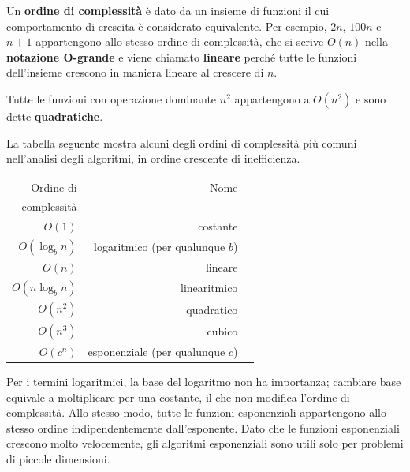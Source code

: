 \documentclass[10pt]{book}
\begin{document}
Un {\bf ordine di complessità} è dato da un insieme di funzioni il cui comportamento di crescita è considerato equivalente.  Per esempio, $2n$, $100n$ e $n+1$ appartengono allo stesso ordine di complessità, che si scrive $O(n)$ nella {\bf notazione O-grande} e viene chiamato {\bf lineare} perché tutte le funzioni dell'insieme crescono in maniera lineare al crescere di $n$.

Tutte le funzioni con operazione dominante $n^2$ appartengono a $O(n^2)$ e sono dette {\bf quadratiche}.

La tabella seguente mostra alcuni degli ordini di complessità più comuni nell'analisi degli algoritmi, in ordine crescente di inefficienza.

\begin{tabular}{|r|r|r|}
\hline
Ordine di     &   Nome      \\
complessità       &               \\
\hline
$O(1)$             & costante \\
$O(\log_b n)$      & logaritmico (per qualunque $b$) \\
$O(n)$             & lineare \\
$O(n \log_b n)$    & linearitmico \\
$O(n^2)$           & quadratico     \\
$O(n^3)$           & cubico     \\
$O(c^n)$           & esponenziale (per qualunque $c$)    \\
\hline
\end{tabular}

Per i termini logaritmici, la base del logaritmo non ha importanza; cambiare base equivale a moltiplicare per una costante, il che non modifica l'ordine di complessità. Allo stesso modo, tutte le funzioni esponenziali appartengono allo stesso ordine indipendentemente dall'esponente. Dato che le funzioni esponenziali crescono molto velocemente, gli algoritmi esponenziali sono utili solo per problemi di piccole dimensioni.
\end{document}
